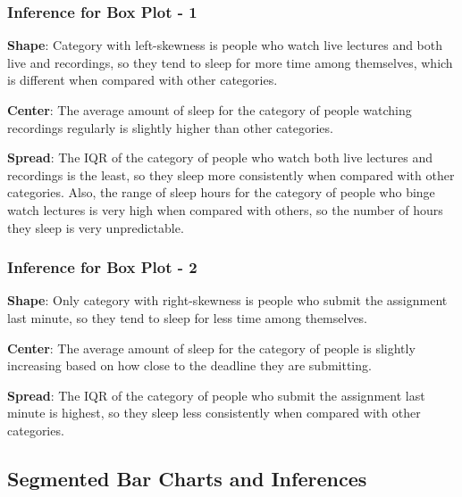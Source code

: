 \documentclass[11pt,]{beamer}
\begin{document}
\begin{frame}

    \frametitle{Inference for Box Plot - 1}
    
    \textbf{Shape}: Category with left-skewness is people who watch live lectures and both live and recordings, so they tend to sleep for more time among themselves, which is different when compared with other categories. 
    
    \bigskip
    
    \textbf{Center}:  The average amount of sleep for the category of people watching recordings regularly is slightly higher than other categories.
    
    \bigskip
    
    \textbf{Spread}: The IQR of the category of people who watch both live lectures and recordings is the least, so they sleep more consistently when compared with other categories. Also, the range of sleep hours for the category of people who binge watch lectures is very high when compared with others, so the number of hours they sleep is very unpredictable.
    
\end{frame}

\begin{frame}

    \frametitle{Inference for Box Plot - 2}
    
    \textbf{Shape}: Only category with right-skewness is people who submit the assignment last minute, so they tend to sleep for less time among themselves. 
    
    \bigskip
    
    \textbf{Center}:  The average amount of sleep for the category of people is slightly increasing based on how close to the deadline they are submitting. 
    
    \bigskip
    
    \textbf{Spread}: The IQR of the category of people who submit the assignment last minute is highest, so they sleep less consistently when compared with other categories. 
    
\end{frame}

\subsection{Segmented Bar Charts and Inferences}
\end{document}
